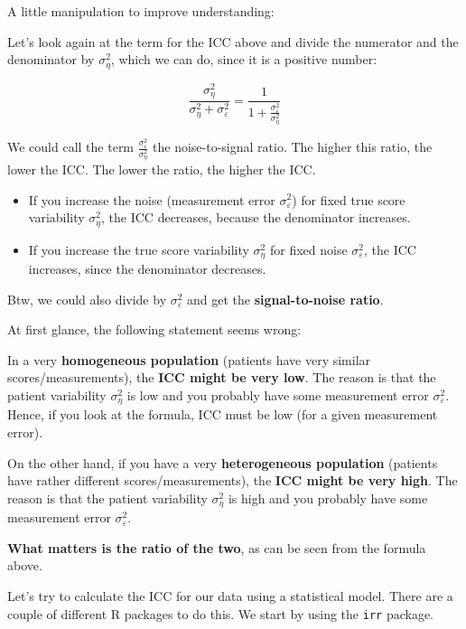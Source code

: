 \documentclass[
]{article}
\providecommand{\tightlist}{%
  \setlength{\itemsep}{0pt}\setlength{\parskip}{0pt}}
\begin{document}
A little manipulation to improve understanding:

Let's look again at the term for the ICC above and divide the numerator and the denominator by
\(\sigma_{\eta}^2\), which we can do, since it is a positive number:

\[\frac{\sigma_{\eta}^2}{\sigma_{\eta}^2 + \sigma_{\varepsilon}^2} = \frac{1}{1 + \frac{\sigma_{\varepsilon}^2}{\sigma_{\eta}^2}}\]

We could call the term \(\frac{\sigma_{\varepsilon}^2}{\sigma_{\eta}^2}\) the noise-to-signal ratio.
The higher this ratio, the lower the ICC. The lower the ratio, the higher the ICC.

\begin{itemize}
\tightlist
\item
  If you increase the noise (measurement error \(\sigma_{\varepsilon}^2\)) for fixed
  true score variability \(\sigma_{\eta}^2\), the ICC decreases, because the denominator
  increases.
\item
  If you increase the true score variability \(\sigma_{\eta}^2\) for fixed noise \(\sigma_{\varepsilon}^2\),
  the ICC increases, since the denominator decreases.
\end{itemize}

Btw, we could also divide by \(\sigma_{\varepsilon}^2\) and get the \textbf{signal-to-noise ratio}.

At first glance, the following statement seems wrong:

In a very \textbf{homogeneous population} (patients have very similar scores/measurements),
the \textbf{ICC might be very low}. The reason is that the patient variability \(\sigma_{\eta}^2\) is low
and you probably have some measurement error \(\sigma_{\varepsilon}^2\).
Hence, if you look at the formula, ICC must be low (for a given measurement error).

On the other hand, if you have a very \textbf{heterogeneous population} (patients have rather different
scores/measurements), the \textbf{ICC might be very high}.
The reason is that the patient variability \(\sigma_{\eta}^2\) is high and you probably
have some measurement error \(\sigma_{\varepsilon}^2\).

\textbf{What matters is the ratio of the two}, as can be seen from the formula above.

Let's try to calculate the ICC for our data using a statistical model. There are a couple of different
R packages to do this. We start by using the \texttt{irr} package.
\end{document}
